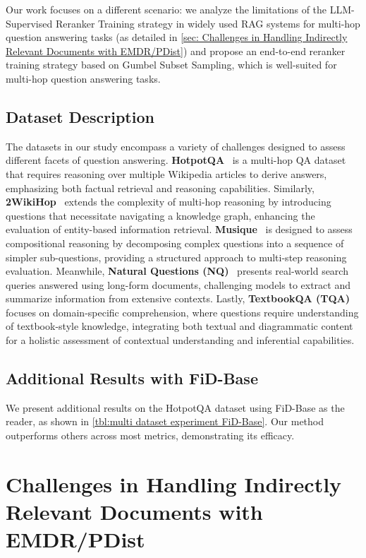 Our work focuses on a different scenario: we analyze the limitations of the LLM-Supervised Reranker Training strategy in widely used RAG systems for multi-hop question answering tasks (as detailed in \autoref{sec: Challenges in Handling Indirectly Relevant Documents with EMDR/PDist}) and propose an end-to-end reranker training strategy based on Gumbel Subset Sampling, which is well-suited for multi-hop question answering tasks.

\subsection{Dataset Description}\label{sec: appendix_datasets}
The datasets in our study encompass a variety of challenges designed to assess different facets of question answering. \textbf{HotpotQA}~\cite{DBLP:conf/emnlp/Yang0ZBCSM18} is a multi-hop QA dataset that requires reasoning over multiple Wikipedia articles to derive answers, emphasizing both factual retrieval and reasoning capabilities. Similarly, \textbf{2WikiHop}~\cite{DBLP:conf/coling/HoNSA20} extends the complexity of multi-hop reasoning by introducing questions that necessitate navigating a knowledge graph, enhancing the evaluation of entity-based information retrieval. \textbf{Musique}~\cite{DBLP:journals/tacl/TrivediBKS22} is designed to assess compositional reasoning by decomposing complex questions into a sequence of simpler sub-questions, providing a structured approach to multi-step reasoning evaluation. Meanwhile, \textbf{Natural Questions (NQ)}~\cite{DBLP:journals/tacl/KwiatkowskiPRCP19} presents real-world search queries answered using long-form documents, challenging models to extract and summarize information from extensive contexts. Lastly, \textbf{TextbookQA (TQA)}~\cite{DBLP:conf/acl/KimKK19} focuses on domain-specific comprehension, where questions require understanding of textbook-style knowledge, integrating both textual and diagrammatic content for a holistic assessment of contextual understanding and inferential capabilities.

\subsection{Additional Results with FiD-Base}
We present additional results on the HotpotQA dataset using FiD-Base as the reader, as shown in \autoref{tbl:multi dataset experiment FiD-Base}. Our method outperforms others across most metrics, demonstrating its efficacy.

\section{Challenges in Handling Indirectly Relevant Documents with EMDR/PDist}\label{sec: Challenges in Handling Indirectly Relevant Documents with EMDR/PDist}

